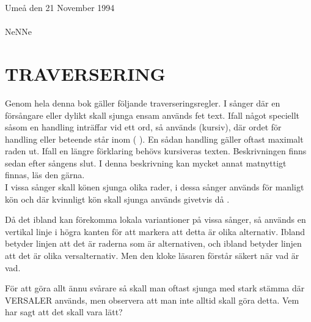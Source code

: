 \documentclass[a6paper,fontsize=10pt,twoside,open=right]{scrbook}
\newcommand*\cleartoleftpage{%
  \clearpage
  \ifodd\value{page}\hbox{}\newpage\fi
}
\begin{document}

\noindent Umeå den 21 November
1994\\ \\ NeNNe
\cleartoleftpage
\section{TRAVERSERING}\vspace{10pt}
\hspace{10pt}Genom hela denna bok gäller följande traverseringsregler. I sånger där
en försångare eller dylikt skall sjunga ensam används fet text. Ifall
något speciellt såsom en handling inträffar vid ett ord, så används
(kursiv), där ordet för handling eller beteende står inom ( ). En
sådan handling gäller oftast maximalt raden ut. Ifall en längre
förklaring behövs kursiveras texten. Beskrivningen finns sedan efter
sångens slut. I denna beskrivning kan mycket annat matnyttigt finnas,
läs den gärna.\\ \indent I vissa sånger skall könen sjunga olika
rader, i dessa sånger används {\Large\Male} för manligt kön och där
kvinnligt kön skall sjunga används givetvis då {\Large\Female}.
\begin{leftborder}
  \hspace{10pt}Då det ibland kan förekomma lokala variantioner på vissa sånger, så
  används en  vertikal linje i högra kanten för att markera att detta
  är olika alternativ. Ibland betyder linjen att det är raderna som är
  alternativen, och ibland betyder linjen att det är olika
  versalternativ. Men den kloke läsaren förstår säkert när vad är vad.
\end{leftborder}
\hspace{15pt} För att göra allt ännu svårare så skall man oftast sjunga med stark
stämma där VERSALER används, men observera att man inte alltid skall
göra detta. Vem har sagt att det skall vara lätt?
\newpage
\cleardoublepage
\renewcommand{\contentsname}{\vspace{-2.17cm}\rmfamily{\fontsize{13}{15}\textbf{INNEHÅLL}}\vspace{-1.2cm}}
\tableofcontents
\end{document}
